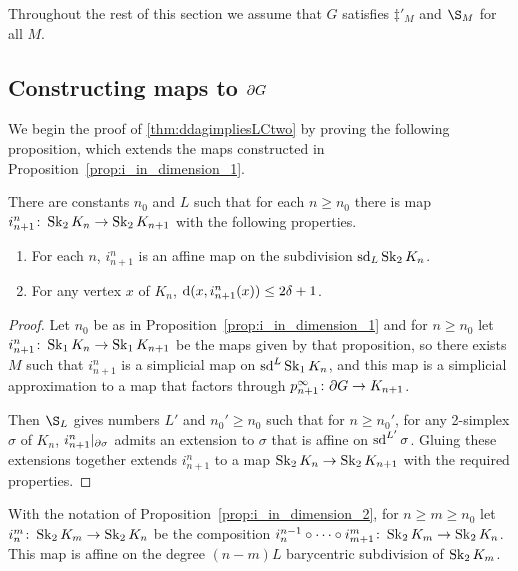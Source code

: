 \documentclass[a4paper]{article}
\begin{document}
Throughout the rest of this section we assume that $G$ satisfies
$\ddag'_M$ and $\S_M$ for all $M$.

\subsection{Constructing maps to $\partial G$}

We begin the proof of \cref{thm:ddagimpliesLCtwo} by proving the following 
proposition, which extends the maps constructed in
Proposition~\ref{prop:i_in_dimension_1}.

\begin{proposition}\label{prop:i_in_dimension_2}
  There are constants $n_0$ and $L$ such that for each $n\geq n_0$ there is map
  $i^n_{n+1}\colon\operatorname{Sk}_2 K_n \to \operatorname{Sk}_2 K_{n+1}$ with the following properties.
  \begin{enumerate}
    \item For each $n$, $i^n_{n+1}$ is an affine map on the subdivision
      $\operatorname{sd}_L\operatorname{Sk}_2 K_n$.
    \item For any vertex $x$ of $K_n$, $\operatorname{d}(x, i^n_{n+1}(x)) \leq 2\delta+1$.
  \end{enumerate}
\end{proposition}

\begin{proof} 
  Let $n_0$ be as in Proposition~\ref{prop:i_in_dimension_1} and for $n \geq
  n_0$ let $i^n_{n+1} \colon \operatorname{Sk}_1 K_n \to \operatorname{Sk}_1 K_{n+1}$ be the maps given
  by that proposition, so there exists $M$ such that $i^n_{n+1}$ is a
  simplicial map on $\operatorname{sd}^L\operatorname{Sk}_1 K_n$, and this map is a simplicial
  approximation to a map that factors through $p^\infty_{n+1} \colon \partial G
  \to K_{n+1}$.

  Then $\S_L$ gives numbers $L'$ and $n_0' \geq n_0$ such that for $n \geq
  n_0'$, for any 2-simplex $\sigma$ of $K_n$, $i^n_{n+1}\vert_{\partial
  \sigma}$ admits an extension to $\sigma$ that is affine on $\operatorname{sd}^{L'}\sigma$.
  Gluing these extensions together extends $i^n_{n+1}$ to a map $\operatorname{Sk}_2 K_n \to
  \operatorname{Sk}_2 K_{n+1}$ with the required properties.
\end{proof}

\begin{definition}
  With the notation of Proposition~\ref{prop:i_in_dimension_2}, for $n \geq m
  \geq n_0$ let $i^m_n \colon \operatorname{Sk}_2 K_m \to \operatorname{Sk}_2 K_n$ be the composition
  $i^{n-1}_n \circ \dotsb \circ i^m_{m+1} \colon \operatorname{Sk}_2 K_m \to 
  \operatorname{Sk}_2 K_n$.  This map is affine on the degree $(n-m)L$ barycentric
  subdivision of $\operatorname{Sk}_2 K_m$.
\end{definition}
\end{document}
